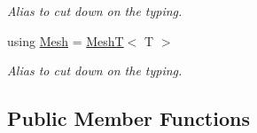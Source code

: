 \begin{DoxyCompactItemize}
\begin{DoxyCompactList}\small\item\em Alias to cut down on the typing. \end{DoxyCompactList}\item 
\mbox{\label{classDcel_1_1MeshT_abe9db973f4510ccb36e20ecfa9223926}} 
using \hyperlink{classDcel_1_1MeshT_abe9db973f4510ccb36e20ecfa9223926}{Mesh} = \hyperlink{classDcel_1_1MeshT}{MeshT}$<$ T $>$
\begin{DoxyCompactList}\small\item\em Alias to cut down on the typing. \end{DoxyCompactList}\end{DoxyCompactItemize}
\subsection*{Public Member Functions}
